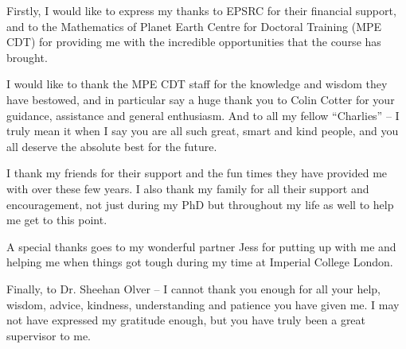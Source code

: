 
\cleardoublepage


\begin{acknowledgements}

Firstly, I would like to express my thanks to EPSRC for their financial support, and to the Mathematics of Planet Earth Centre for Doctoral Training (MPE CDT) for providing me with the incredible opportunities that the course has brought. 

I would like to thank the MPE CDT staff for the knowledge and wisdom they have bestowed, and in particular say a huge thank you to Colin Cotter for your guidance, assistance and general enthusiasm. And to all my fellow \enquote{Charlies} -- I truly mean it when I say you are all such great, smart and kind people, and you all deserve the absolute best for the future.

I thank my friends for their support and the fun times they have provided me with over these few years. I also thank my family for all their support and encouragement, not just during my PhD but throughout my life as well to help me get to this point.

A special thanks goes to my wonderful partner Jess for putting up with me and helping me when things got tough during my time at Imperial College London.

Finally, to Dr. Sheehan Olver -- I cannot thank you enough for all your help, wisdom, advice, kindness, understanding and patience you have given me. I may not have expressed my gratitude enough, but you have truly been a great supervisor to me.


%

\end{acknowledgements}
